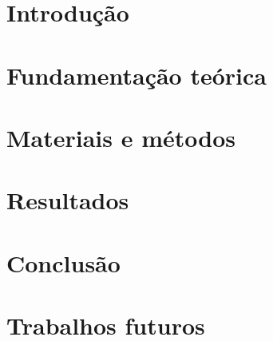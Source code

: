 \documentclass[oneside,monografia]{iftex2020}
\begin{document}
\maketitle

\chapter{Introdução}



\chapter{Fundamentação teórica}




%  

\chapter{Materiais e métodos}



\chapter{Resultados}



\chapter{Conclusão}



\chapter{Trabalhos futuros}


\end{document}
